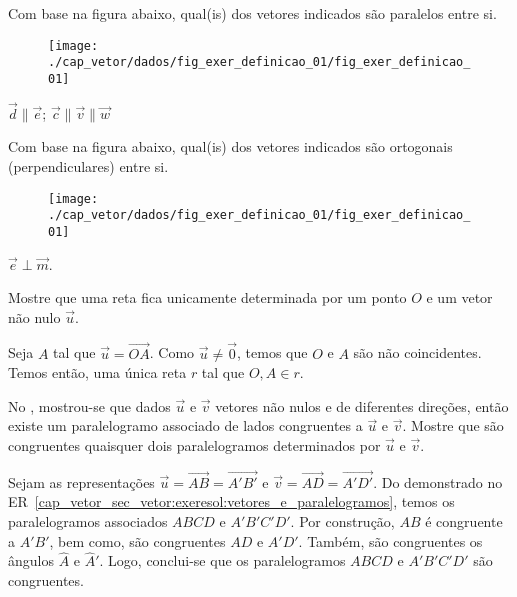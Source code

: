 \begin{exer}
  Com base na figura abaixo, qual(is) dos vetores indicados são paralelos entre si.
  \begin{figure}[H]
    \centering
    \texttt{[image: ./cap\_vetor/dados/fig\_exer\_definicao\_01/fig\_exer\_definicao\_01]}
  \end{figure}
\end{exer}
\begin{resp}
  $\vec{d}\parallel\vec{e}$; $\vec{c}\parallel\vec{v}\parallel\vec{w}$
\end{resp}

\begin{exer}
  Com base na figura abaixo, qual(is) dos vetores indicados são ortogonais (perpendiculares) entre si.
  \begin{figure}[H]
    \centering
    \texttt{[image: ./cap\_vetor/dados/fig\_exer\_definicao\_01/fig\_exer\_definicao\_01]}
  \end{figure}
\end{exer}
\begin{resp}
  $\vec{e}\perp\vec{m}$.
\end{resp}

\begin{exer}
  Mostre que uma reta fica unicamente determinada por um ponto $O$ e um vetor não nulo $\vec{u}$.
\end{exer}
\begin{resp}
  Seja $A$ tal que $\vec{u} = \overrightarrow{OA}$. Como $\vec{u}\neq\vec{0}$, temos que $O$ e $A$ são não coincidentes. Temos então, uma única reta $r$ tal que $O,A\in r$.
\end{resp}

\begin{exer}\label{cap_vetor_sec_vetor:exer:vetores_e_paralelogramos}
  No , mostrou-se que dados $\vec{u}$ e $\vec{v}$ vetores não nulos e de diferentes direções, então existe um paralelogramo associado de lados congruentes a $\vec{u}$ e $\vec{v}$. Mostre que são congruentes quaisquer dois paralelogramos determinados por $\vec{u}$ e $\vec{v}$.
\end{exer}
\begin{resp}
  Sejam as representações $\vec{u}=\overrightarrow{AB}=\overrightarrow{A'B'}$ e $\vec{v}=\overrightarrow{AD}=\overrightarrow{A'D'}$. Do demonstrado no ER~\ref{cap_vetor_sec_vetor:exeresol:vetores_e_paralelogramos}, temos os paralelogramos associados $ABCD$ e $A'B'C'D'$. Por construção, $AB$ é congruente a $A'B'$, bem como, são congruentes $AD$ e $A'D'$. Também, são congruentes os ângulos $\hat{A}$ e $\hat{A}'$. Logo, conclui-se que os paralelogramos $ABCD$ e $A'B'C'D'$ são congruentes.
\end{resp}

